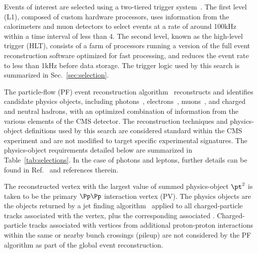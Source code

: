 Events of interest are selected using a two-tiered trigger
system~\cite{Khachatryan:2016bia}. The first level (L1), composed of
custom hardware processors, uses information from the calorimeters and
muon detectors to select events at a rate of around 100\unit{kHz}
within a time interval of less than 4\mus. The second level, known as
the high-level trigger (HLT), consists of a farm of processors running
a version of the full event reconstruction software optimized for fast
processing, and reduces the event rate to less than 1\unit{kHz} before
data storage. The trigger logic used by this search is summarized in
Sec.~\ref{sec:selection}.

The particle-flow (PF) event reconstruction
algorithm~\cite{Sirunyan:2017ulk} reconstructs and identifies
candidate physics objects, including
photons~\cite{Khachatryan:2015iwa},
electrons~\cite{Khachatryan:2015hwa}, muons~\cite{Chatrchyan:2012xi},
and charged and neutral hadrons, with an optimized combination of
information from the various elements of the CMS detector. The
reconstruction techniques and physics-object definitions used by this
search are considered standard within the CMS experiment and are not
modified to target specific experimental signatures. The
physics-object requirements detailed below are summarized in
Table~\ref{tab:selections}. In the case of photons and leptons,
further details can be found in Ref.~\cite{Khachatryan:2016dvc} and
references therein. 

The reconstructed vertex with the largest value of summed
physics-object $\pt^2$ is taken to be the primary $\Pp\Pp$ interaction
vertex (PV). The physics objects are the objects returned by a jet
finding algorithm~\cite{Cacciari:2008gp, Cacciari:2011ma} applied to
all charged-particle tracks associated with the vertex, plus the
corresponding associated \ptmiss. Charged-particle tracks associated
with vertices from additional proton-proton interactions within the
same or nearby bunch crossings (pileup) are not considered by the PF
algorithm as part of the global event reconstruction.

